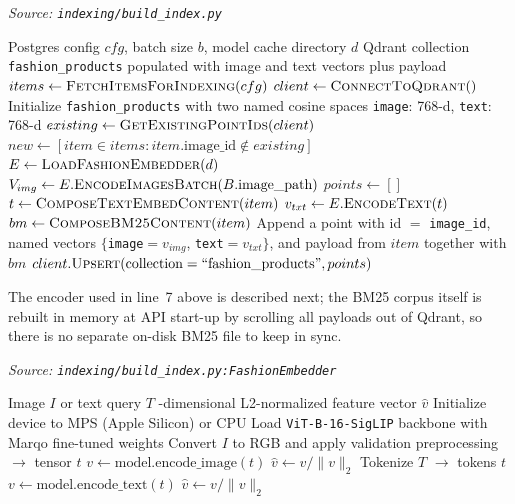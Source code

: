 \begin{algorithm}[H]
\caption{Build Multi-Vector Index}\label{alg:build_index}
\textit{Source: \texttt{indexing/build\_index.py}}
\begin{algorithmic}[1]
\Require Postgres config $cfg$, batch size $b$, model cache directory $d$
\Ensure Qdrant collection \texttt{fashion\_products} populated with image and text vectors plus payload
\State $items \gets \textsc{FetchItemsForIndexing}(cfg)$ 
\State $client \gets \textsc{ConnectToQdrant}()$
\State Initialize \texttt{fashion\_products} with two named cosine spaces
\Statex \quad\quad \texttt{image}: 768-d, \texttt{text}: 768-d
\State $existing \gets \textsc{GetExistingPointIds}(client)$
\State $new \gets [item \in items : item.\text{image\_id} \notin existing]$
\State $E \gets \textsc{LoadFashionEmbedder}(d)$
    \State $V_{img} \gets E.\textsc{EncodeImagesBatch}(B.\text{image\_path})$
    \State $points \gets []$
        \State $t \gets \textsc{ComposeTextEmbedContent}(item)$ 
        \State $v_{txt} \gets E.\textsc{EncodeText}(t)$
        \State $bm \gets \textsc{ComposeBM25Content}(item)$
        \State Append a point with id $=$ \texttt{image\_id}, named vectors $\{$\texttt{image}$=v_{img}$, \texttt{text}$=v_{txt}\}$, and payload from $item$ together with $bm$
    \EndFor
    \State $client.\textsc{Upsert}(\text{collection}=\text{``fashion\_products''}, points)$
\EndFor
\end{algorithmic}
\end{algorithm}

The encoder used in line~7 above is described next; the BM25 corpus itself is rebuilt in memory at API start-up by scrolling all payloads out of Qdrant, so there is no separate on-disk BM25 file to keep in sync.

\begin{algorithm}[H]
\caption{Cross-Modal Encoding via Marqo-FashionSigLIP}\label{alg:fashionsiglip}
\textit{Source: \texttt{indexing/build\_index.py:FashionEmbedder}}
\begin{algorithmic}[1]
\Require Image $I$ or text query $T$
-dimensional L2-normalized feature vector $\hat{v}$
\State Initialize device to MPS (Apple Silicon) or CPU
\State Load \texttt{ViT-B-16-SigLIP} backbone with Marqo fine-tuned weights
    \State Convert $I$ to RGB and apply validation preprocessing $\to$ tensor $t$
    \State $v \gets \text{model.encode\_image}(t)$
    \State \Return $\hat{v} \gets v / \|v\|_2$
\EndFunction
\Statex
{}
    \State Tokenize $T$ $\to$ tokens $t$
    \State $v \gets \text{model.encode\_text}(t)$
    \State \Return $\hat{v} \gets v / \|v\|_2$
\EndFunction
\end{algorithmic}
\end{algorithm}

